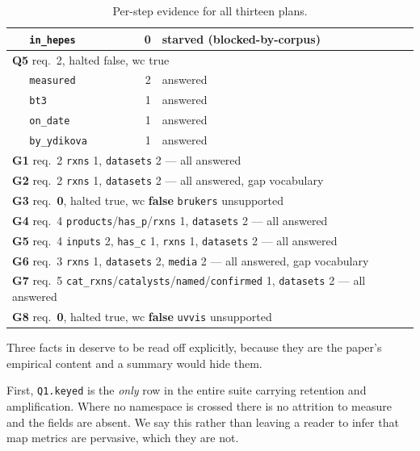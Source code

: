 \documentclass[11pt,a4paper]{article}
\theoremstyle{plain}
\theoremstyle{definition}
\theoremstyle{remark}
\newcommand{\vans}{\textsf{answered}}
\newcommand{\vsurf}{\textsf{unsupported}}
\newcommand{\vstarve}{\textsf{starved}}
\newcommand{\bcorp}{\textsf{blocked-by-corpus}}
\begin{document}
\begin{table}[H]
\begin{tabular}{llrl}
& \texttt{in\_hepes} & 0 & \vstarve{} \quad (\bcorp) \\
\midrule
\multicolumn{4}{l}{\textbf{Q5} \quad req.\ 2, halted false, wc true} \\
& \texttt{measured} & 2 & \vans \\
& \texttt{bt3} & 1 & \vans \\
& \texttt{on\_date} & 1 & \vans \\
& \texttt{by\_ydikova} & 1 & \vans \\
\midrule
\multicolumn{4}{l}{\textbf{G1} req.\ 2 \quad \texttt{rxns} 1, \texttt{datasets} 2 --- all \vans} \\
\multicolumn{4}{l}{\textbf{G2} req.\ 2 \quad \texttt{rxns} 1, \texttt{datasets} 2 --- all \vans{}, gap \textsf{vocabulary}} \\
\multicolumn{4}{l}{\textbf{G3} req.\ \textbf{0}, halted true, wc \textbf{false} \quad \texttt{brukers} \vsurf} \\
\multicolumn{4}{l}{\textbf{G4} req.\ 4 \quad \texttt{products}/\texttt{has\_p}/\texttt{rxns} 1, \texttt{datasets} 2 --- all \vans} \\
\multicolumn{4}{l}{\textbf{G5} req.\ 4 \quad \texttt{inputs} 2, \texttt{has\_c} 1, \texttt{rxns} 1, \texttt{datasets} 2 --- all \vans} \\
\multicolumn{4}{l}{\textbf{G6} req.\ 3 \quad \texttt{rxns} 1, \texttt{datasets} 2, \texttt{media} 2 --- all \vans{}, gap \textsf{vocabulary}} \\
\multicolumn{4}{l}{\textbf{G7} req.\ 5 \quad \texttt{cat\_rxns}/\texttt{catalysts}/\texttt{named}/\texttt{confirmed} 1, \texttt{datasets} 2 --- all \vans} \\
\multicolumn{4}{l}{\textbf{G8} req.\ \textbf{0}, halted true, wc \textbf{false} \quad \texttt{uvvis} \vsurf} \\
\bottomrule
\end{tabular}
\caption{Per-step evidence for all thirteen plans.}
\label{tab:evidence}
\end{table}

Three facts in  deserve to be read off explicitly,
because they are the paper's empirical content and a summary would hide
them.

First, \texttt{Q1.keyed} is the \emph{only} row in the entire suite
carrying retention and amplification. Where no namespace is crossed
there is no attrition to measure and the fields are absent. We say this
rather than leaving a reader to infer that map metrics are pervasive,
which they are not.
\end{document}
